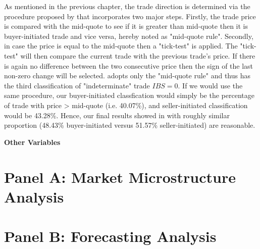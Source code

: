 As mentioned in the previous chapter, the trade direction is determined via the procedure proposed by \citet{leeready1991} that incorporates two major steps. Firstly, the trade price is compared with the mid-quote to see if it is greater than mid-quote then it is buyer-initiated trade and vice versa, hereby noted as "mid-quote rule". Secondly, in case the price is equal to the mid-quote then a "tick-test" is applied. The "tick-test" will then compare the current trade with the previous trade's price. If there is again no difference between the two consecutive price then the sign of the last non-zero change will be selected. \citet{hausman1992} adopts only the "mid-quote rule" and thus has the third classification of "indeterminate" trade $IBS = 0$. If we would use the same procedure, our buyer-initiated classfication would simply be the percentage of trade with price > mid-quote (i.e. 40.07\%), and seller-initiated classification would be 43.28\%. Hence, our final results showed in  with roughly similar proportion (48.43\% buyer-initiated versus 51.57\% seller-initiated) are reasonable.


\begin{table}[H]
\centering
{}
\caption{Summary statistics: Trade Direction}
\label{tab:table-5}
\end{table}

{\noindent\bfseries Other Variables }


\section{Panel A: Market Microstructure Analysis}

\section{Panel B: Forecasting Analysis}